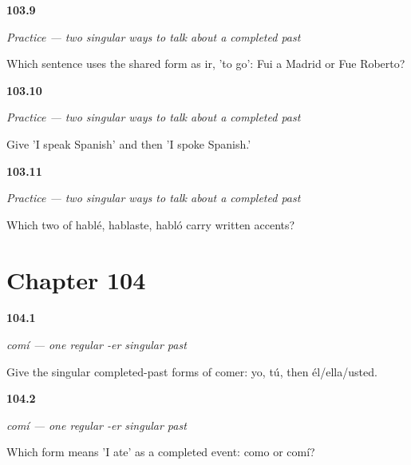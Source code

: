\noindent\begin{minipage}[t]{\linewidth}
\raggedright
\hypertarget{review-ES-C14-practice-context-ser-ir}{\textbf{103.9}} \emph{Practice — two singular ways to talk about a completed past}\par
\small Which sentence uses the shared form as ir, 'to go': Fui a Madrid or Fue Roberto?
\end{minipage}\par\medskip

\noindent\begin{minipage}[t]{\linewidth}
\raggedright
\hypertarget{review-ES-C14-practice-present-past}{\textbf{103.10}} \emph{Practice — two singular ways to talk about a completed past}\par
\small Give 'I speak Spanish' and then 'I spoke Spanish.'
\end{minipage}\par\medskip

\noindent\begin{minipage}[t]{\linewidth}
\raggedright
\hypertarget{review-ES-C14-practice-written-accents}{\textbf{103.11}} \emph{Practice — two singular ways to talk about a completed past}\par
\small Which two of hablé, hablaste, habló carry written accents?
\end{minipage}\par\medskip

\section*{Chapter 104}

\noindent\begin{minipage}[t]{\linewidth}
\raggedright
\hypertarget{review-ES-C15-comer-preterite-singular-forms}{\textbf{104.1}} \emph{comí — one regular -er singular past}\par
\small Give the singular completed-past forms of comer: yo, tú, then él/ella/usted.
\end{minipage}\par\medskip

\noindent\begin{minipage}[t]{\linewidth}
\raggedright
\hypertarget{review-ES-C15-comer-preterite-past-choice}{\textbf{104.2}} \emph{comí — one regular -er singular past}\par
\small Which form means 'I ate' as a completed event: como or comí?
\end{minipage}\par\medskip


